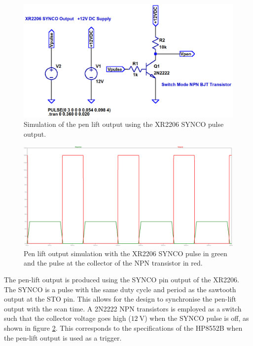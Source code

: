 \documentclass[class=report,11pt,crop=false]{standalone}
\begin{document}
	\begin{figure}
		\centering
		\includegraphics[width=0.45\linewidth]{Figures/Methodology/emulator-pen-lift-ct-sim}
		\caption{Simulation of the pen lift output using the XR2206 SYNCO pulse output.}
		\label{fig:emulator-pen-lift-ct-sim}
	\end{figure}
	
	\begin{figure}
		\centering
		\includegraphics[width=0.7\linewidth]{Figures/Methodology/emulator-pen-lift-ct-sim-output}
		\caption{Pen lift output simulation with the XR2206 SYNCO pulse in green and the pulse at the collector of the NPN transistor in red.}
		\label{fig:emulator-pen-lift-ct-output}
	\end{figure}

	The pen-lift output is produced using the SYNCO pin output of the XR2206. The SYNCO is a pulse with the same duty cycle and period as the sawtooth output at the STO pin. This allows for the design to synchronise the pen-lift output with the scan time. A 2N2222 NPN transistors is employed as a switch such that the collector voltage goes high ($\SI{12}{\volt}$) when the SYNCO pulse is off, as shown in figure \ref{fig:emulator-pen-lift-ct-output}. This corresponds to the specifications of the HP8552B when the pen-lift output is used as a trigger. 	
	
\end{document}
